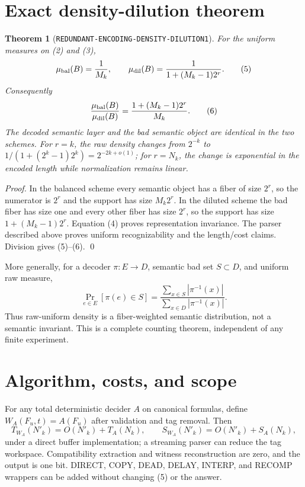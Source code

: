 \documentclass[11pt]{article}
\newtheorem{theorem}{Theorem}
\begin{document}
\section{Exact density-dilution theorem}
\begin{theorem}[\texttt{REDUNDANT-ENCODING-DENSITY-DILUTION1}]
For the uniform measures on (2) and (3),
\[
 \mu_{\rm bal}(B)=\frac1{M_k},\qquad
 \mu_{\rm dil}(B)=\frac1{1+(M_k-1)2^r}.                 \tag{5}
\]
Consequently
\[
 \frac{\mu_{\rm bal}(B)}{\mu_{\rm dil}(B)}
 =\frac{1+(M_k-1)2^r}{M_k}.                              \tag{6}
\]
The decoded semantic layer and the bad semantic object are identical in the
two schemes.  For \(r=k\), the raw density changes from \(2^{-k}\) to
\(1/(1+(2^k-1)2^k)=2^{-2k+o(1)}\); for \(r=N_k\), the change is exponential
in the encoded length while normalization remains linear.
\end{theorem}

\begin{proof}
In the balanced scheme every semantic object has a fiber of size \(2^r\), so
the numerator is \(2^r\) and the support has size \(M_k2^r\).  In the diluted
scheme the bad fiber has size one and every other fiber has size \(2^r\), so
the support has size \(1+(M_k-1)2^r\).  Equation (4) proves representation
invariance.  The parser described above proves uniform recognizability and
the length/cost claims.  Division gives (5)--(6). \qed
\end{proof}

More generally, for a decoder \(\pi:E\to D\), semantic bad set \(S\subset D\),
and uniform raw measure,
\[
 \Pr_{e\in E}[\pi(e)\in S]
 =\frac{\sum_{x\in S}|\pi^{-1}(x)|}
        {\sum_{x\in D}|\pi^{-1}(x)|}.                    \tag{7}
\]
Thus raw-uniform density is a fiber-weighted semantic distribution, not a
semantic invariant. This is a complete counting theorem, independent of any
finite experiment.

\section{Algorithm, costs, and scope}
For any total deterministic decider \(A\) on canonical formulas, define
\(W_A(F_u,t)=A(F_u)\) after validation and tag removal. Then
\[
 T_{W_A}(N'_k)=O(N'_k)+T_A(N_k),\qquad
 S_{W_A}(N'_k)=O(N'_k)+S_A(N_k),                          \tag{8}
\]
under a direct buffer implementation; a streaming parser can reduce the tag
workspace. Compatibility extraction and witness reconstruction are zero, and
the output is one bit. DIRECT, COPY, DEAD, DELAY, INTERP, and RECOMP wrappers
can be added without changing (5) or the answer.
\end{document}
